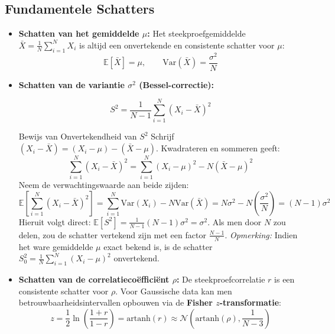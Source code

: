 \documentclass[11pt,a4paper]{article}
\newcommand{\E}{\mathbb{E}}
\newcommand{\Var}{\text{Var}}
\newcommand{\normdist}{\mathcal{N}}
\begin{document}
\subsection{Fundamentele Schatters}
\begin{itemize}[leftmargin=1.5em]
    \item \textbf{Schatten van het gemiddelde $\mu$:}
    Het steekproefgemiddelde $\bar{X} = \frac{1}{N}\sum_{i=1}^N X_i$ is altijd een onvertekende en consistente schatter voor $\mu$:
    \begin{equation}
        \E[\bar{X}] = \mu, \qquad \Var(\bar{X}) = \frac{\sigma^2}{N}
    \end{equation}
    \item \textbf{Schatten van de variantie $\sigma^2$ (Bessel-correctie):}
    \begin{formulabox}
    \begin{equation}
        S^2 = \frac{1}{N - 1} \sum_{i=1}^N (X_i - \bar{X})^2
    \end{equation}
    \end{formulabox}
    \begin{theobox}{Bewijs van Onvertekendheid van $S^2$}
    Schrijf $(X_i - \bar{X}) = (X_i - \mu) - (\bar{X} - \mu)$. Kwadrateren en sommeren geeft:
    \begin{equation}
        \sum_{i=1}^N (X_i - \bar{X})^2 = \sum_{i=1}^N (X_i - \mu)^2 - N(\bar{X} - \mu)^2
    \end{equation}
    Neem de verwachtingswaarde aan beide zijden:
    \begin{equation}
        \E\left[ \sum_{i=1}^N (X_i - \bar{X})^2 \right] = \sum_{i=1}^N \Var(X_i) - N \Var(\bar{X}) = N\sigma^2 - N \left( \frac{\sigma^2}{N} \right) = (N - 1)\sigma^2
    \end{equation}
    Hieruit volgt direct: $\E[S^2] = \frac{1}{N - 1} (N - 1)\sigma^2 = \sigma^2$.
    Als men door $N$ zou delen, zou de schatter vertekend zijn met een factor $\frac{N-1}{N}$.
    \emph{Opmerking:} Indien het ware gemiddelde $\mu$ exact bekend is, is de schatter $S_0^2 = \frac{1}{N}\sum_{i=1}^N (X_i - \mu)^2$ onvertekend.
    \end{theobox}

    \item \textbf{Schatten van de correlatiecoëfficiënt $\rho$:}
    De steekproefcorrelatie $r$ is een consistente schatter voor $\rho$. Voor Gaussische data kan men betrouwbaarheidsintervallen opbouwen via de \textbf{Fisher $z$-transformatie}:
    \begin{equation}
        z = \frac{1}{2} \ln \left( \frac{1 + r}{1 - r} \right) = \text{artanh}(r) \approx \normdist\left( \text{artanh}(\rho), \frac{1}{N - 3} \right)
    \end{equation}
\end{itemize}
\end{document}
